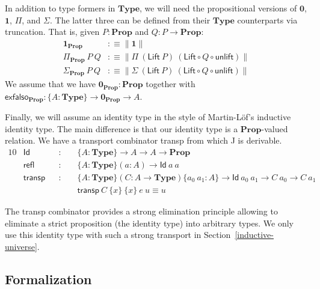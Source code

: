 \documentclass[autoref]{llncs}
\newcommand{\mType}{\mathbf{Type}}
\newcommand{\mProp}{\mathbf{Prop}}
\begin{document}
In addition to type formers in $\mType$, we will need the propositional versions
of $\mathbf{0}$, $\mathbf{1}$, $\Pi$, and $\Sigma$. The latter three can be defined from their
$\mType$ counterparts via truncation. That is, given $P : \mProp$ and $Q : P \to
\mProp$:
\vspace{-0.2em}
\begin{align*}
  \mathbf{1}_\mProp & :\equiv \| \mathbf{1} \| \\
  \Pi_\mProp\ P\ Q & :\equiv \| \Pi\ (\textsf{Lift} \ P)\ (\textsf{Lift} \circ Q \circ \textsf{unlift}) \| \\
  \Sigma_\mProp\ P\ Q & :\equiv \| \Sigma\ (\textsf{Lift} \ P)\ (\textsf{Lift} \circ Q \circ \textsf{unlift}) \|
\end{align*}
We assume that we have
$\mathbf{0}_\mProp:\mProp$ together with $\mathsf{exfalso}_\mProp :\{A:\mType \} \to \mathbf{0}_\mProp \to A$.

Finally, we will assume an identity type in the style of Martin-L\"of's
inductive identity type. The main difference is that our identity type is a
$\mProp$-valued relation. We have a transport combinator
\textsf{transp} from which \textsf{J} is derivable.
\vspace{-0.2em}
\begin{alignat*}{10}
  & \textsf{Id} && :\,\, && \{A : \mType \} \to A \to A \to \mProp \\
  & \textsf{refl} && : && \{A : \mType \} (a : A) \to \textsf{Id}\ a\ a \\
  & \textsf{transp} && : && \{A : \mType \} (C : A \to \mType) \{a_0\ a_1 : A\} \to \textsf{Id}\ a_0\ a_1 \to C\ a_0 \to C\ a_1 \\
  & && && \textsf{transp}\ C\ \{x\}\ \{x\}\ e\ u \equiv u
\end{alignat*}

The \textsf{transp} combinator provides a strong elimination principle allowing
to eliminate a strict proposition (the identity type) into arbitrary types.
%
We only use this identity type with such a strong transport in Section~\ref{inductive-universe}.
%

\subsection{Formalization}
\end{document}
